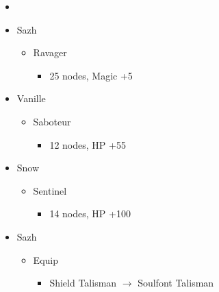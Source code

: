 \begin{multicols}{2}
\begin{menu}
\begin{itemize}
    \paradigm
    \begin{itemize}
        \item {}%
{\paradigmline[1]{\textit{\syn}}{\textit{\sab}}{\textit{\rav}}}%
{\paradigmline{\com}{\med}{\com}}%
{\paradigmline{\syn}{\med}{\com}}%
{\paradigmline{\com}{\sab}{\com}}%
{\paradigmline{(\rav)}{\sab}{(\rav)}}%
{\paradigmline{\com}{\rav}{\com}}
    \end{itemize}
    \crystarium
    \begin{itemize}
        \item Sazh
        \begin{itemize}
            \item Ravager
            \begin{itemize}
                \item 25 nodes, Magic +5
            \end{itemize}
        \end{itemize}
        \item Vanille
        \begin{itemize}
            \item Saboteur
            \begin{itemize}
                \item 12 nodes, HP +55
            \end{itemize}
        \end{itemize}
        \item Snow
        \begin{itemize}
            \item Sentinel
            \begin{itemize}
                \item 14 nodes, HP +100
            \end{itemize}
        \end{itemize}
    \end{itemize}
    \equip
    \begin{itemize}
        \item Sazh
        \begin{itemize}
            \item Equip
            \begin{itemize}
                \item Shield Talisman $\rightarrow$ Soulfont Talisman
            \end{itemize}

\end{itemize}
\end{itemize}
\end{itemize}
\end{menu}
\end{multicols}
